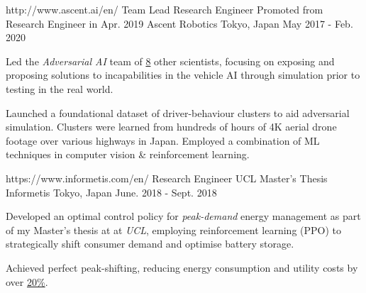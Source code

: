 \begin{cventries}
  \cventry
    {http://www.ascent.ai/en/}
    {Team Lead Research Engineer} %
    {Promoted from Research Engineer in Apr. 2019}
    {Ascent Robotics} %
    {Tokyo, Japan} %
    {May 2017 - Feb. 2020} %
    {
      \begin{cvitems} %
        \item {Led the \textit{Adversarial AI} team of \underline{8} other scientists, focusing on exposing and proposing solutions to incapabilities in the vehicle AI through simulation prior to testing in the real world.}
        \item {Launched a foundational dataset of driver-behaviour clusters to aid adversarial simulation. Clusters were learned from hundreds of hours of 4K aerial drone footage over various highways in Japan. Employed a combination of ML techniques in computer vision \& reinforcement learning.}
      \end{cvitems}
    }

  \cventry
    {https://www.informetis.com/en/}
    {Research Engineer} %
    {UCL Master's Thesis}
    {Informetis} %
    {Tokyo, Japan} %
    {June. 2018 - Sept. 2018} %
    {
      \begin{cvitems} %
        \item {Developed an optimal control policy for \emph{peak-demand} energy management as part of my Master's thesis at at \emph{UCL}, employing reinforcement learning (PPO) to strategically shift consumer demand and optimise battery storage.}
        \item {Achieved perfect peak-shifting, reducing energy consumption and utility costs by over \underline{20\%}.}
      \end{cvitems}
    }


\end{cventries}
